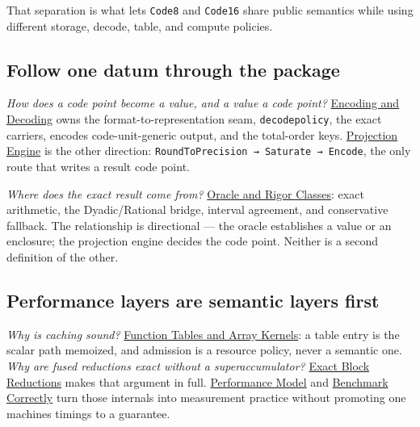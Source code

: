 That separation is what lets \texttt{Code8} and \texttt{Code16} share public semantics while using different storage, decode, table, and compute policies.



\subsection{Follow one datum through the package}



\label{2915716024276652272}{}


\emph{How does a code point become a value, and a value a code point?} \href{internals\_\allowbreak{}encoding\_\allowbreak{}decoding.md}{Encoding and Decoding} owns the format-to-representation seam, \texttt{decodepolicy}, the exact carriers, encode{\textquotesingle}s code-unit-generic output, and the total-order keys. \href{internals\_\allowbreak{}projection\_\allowbreak{}engine.md}{Projection Engine} is the other direction: \texttt{RoundToPrecision → Saturate → Encode}, the only route that writes a result code point.



\emph{Where does the exact result come from?} \href{internals\_\allowbreak{}oracle.md}{Oracle and Rigor Classes}: exact arithmetic, the Dyadic/Rational bridge, interval agreement, and conservative fallback. The relationship is directional — the oracle establishes a value or an enclosure; the projection engine decides the code point. Neither is a second definition of the other.



\subsection{Performance layers are semantic layers first}



\label{14499876576372631187}{}


\emph{Why is caching sound?} \href{internals\_\allowbreak{}tables.md}{Function Tables and Array Kernels}: a table entry is the scalar path memoized, and admission is a resource policy, never a semantic one. \emph{Why are fused reductions exact without a superaccumulator?} \href{internals\_\allowbreak{}blocks.md}{Exact Block Reductions} makes that argument in full. \href{concept\_\allowbreak{}performance.md}{Performance Model} and \href{internals\_\allowbreak{}benchmark.md}{Benchmark Correctly} turn those internals into measurement practice without promoting one machine{\textquotesingle}s timings to a guarantee.



